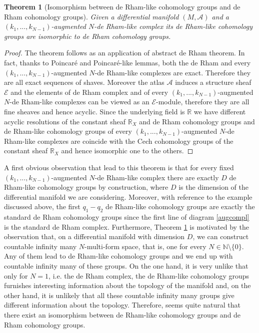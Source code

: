 \documentclass[a4paper,12pt]{article}
\newtheorem{Theorem}{Theorem}[section]
\begin{document}
\begin{Theorem}[Isomorphism between de Rham-like cohomology groups and de Rham cohomology groups]\label{con4.3.1}
Given a differential manifold $(M,\mathcal{A})$ and a $(k_1,...,k_{N-1})$-augmented $N$-de Rham-like complex its de Rham-like cohomology groups are isomorphic to de Rham cohomology groups.
\end{Theorem}
\begin{proof}
    The theorem follows as an application of abstract de Rham theorem. In fact, thanks to Poincaré and Poincaré-like lemmas, both the de Rham and every $(k_1,...,k_{N-1})$-augmented $N$-de Rham-like complexes are exact. Therefore they are all exact sequences of shaves. Moreover the atlas $\mathcal{A}$ induces a structure sheaf $\mathcal{E}$ and the elements of de Rham complex and  of every $(k_1,...,k_{N-1})$-augmented $N$-de Rham-like complexes can be viewed as an $\mathcal{E}$-module, therefore they are all fine sheaves and hence acyclic. Since the underlying field is $\mathbb{R}$ we have different acyclic resolutions of the constant sheaf $\mathbb{R}_X$ and de Rham cohomology groups and de Rham-like cohomology groups of every $(k_1,...,k_{N-1})$-augmented $N$-de Rham-like complexes are coincide with the Cech cohomology groups of the constant sheaf $\mathbb{R}_X$ and hence isomorphic one to the others. 
\end{proof}
A first obvious observation that lead to this theorem is that for every fixed $(k_1,...,k_{N-1})$-augmented $N$-de Rham-like complex there are exactly $D$ de Rham-like cohomology groups by construction, where $D$ is the dimension of the differential manifold we are considering. Moreover, with reference to the example discussed above, the first $q_1-q_2$ de Rham-like cohomology groups are exactly the standard de Rham cohomology groups since the first line of diagram \eqref{augcompl} is the standard de Rham complex. Furthermore, Theorem \ref{con4.3.1} is motivated by the observation that, on a differential manifold with dimension $D$, we can construct countable infinity many $N$-multi-form space, that is, one for every $N \in \mathbb{N} \setminus \{0\}$. Any of them lead to de Rham-like cohomology groups and we end up with countable infinity many of these groups. On the one hand, it is very unlike that only for $N=1$, i.e. the de Rham complex, the de Rham-like cohomology groups furnishes interesting information about the topology of the manifold and, on the other hand, it is unlikely that all these countable infinity many groups give different information about the topology. Therefore, seems quite natural that there exist an isomorphism between de Rham-like cohomology groups and de Rham cohomology groups.  \\
\end{document}
